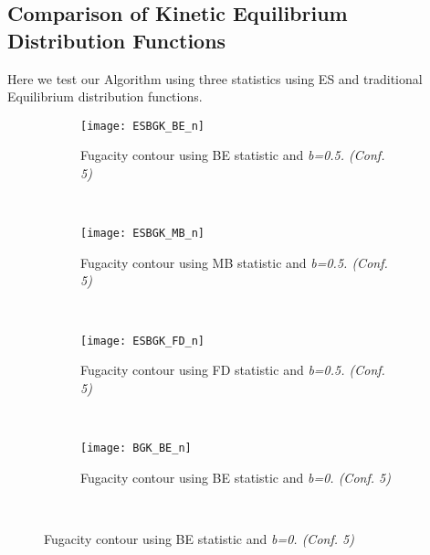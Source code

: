 \documentclass{rsproca}%
\begin{document}
\subsection{Comparison of Kinetic Equilibrium Distribution Functions}
Here we test our Algorithm using three statistics using ES and traditional Equilibrium distribution functions.

\begin{figure}
        \centering
        \begin{subfigure}[b]{0.32\textwidth}
                \centering
                \texttt{[image: ESBGK\_BE\_n]}
                \caption{Fugacity contour using BE statistic and \it{b=0.5}. (Conf. 5)}
                \label{fig:ESBGK_BE_n}
        \end{subfigure}%
        ~ %
        \begin{subfigure}[b]{0.32\textwidth}
                \centering
                \texttt{[image: ESBGK\_MB\_n]}
                \caption{Fugacity contour using MB statistic and \it{b=0.5}. (Conf. 5)}
                \label{fig:ESBGK_MB_n}
        \end{subfigure}
        ~ %
        \begin{subfigure}[b]{0.32\textwidth}
                \centering
                \texttt{[image: ESBGK\_FD\_n]}
                \caption{Fugacity contour using FD statistic and \it{b=0.5}. (Conf. 5)}
                \label{fig:ESBGK_FD_n}
        \end{subfigure}
        ~ %
        \begin{subfigure}[b]{0.32\textwidth}
                \centering
                \texttt{[image: BGK\_BE\_n]}
                \caption{Fugacity contour using BE statistic and \it{b=0}. (Conf. 5)}
                \label{fig:BGK_BE_n}
        \end{subfigure}%
        ~ %

\end{figure}
\end{document}
